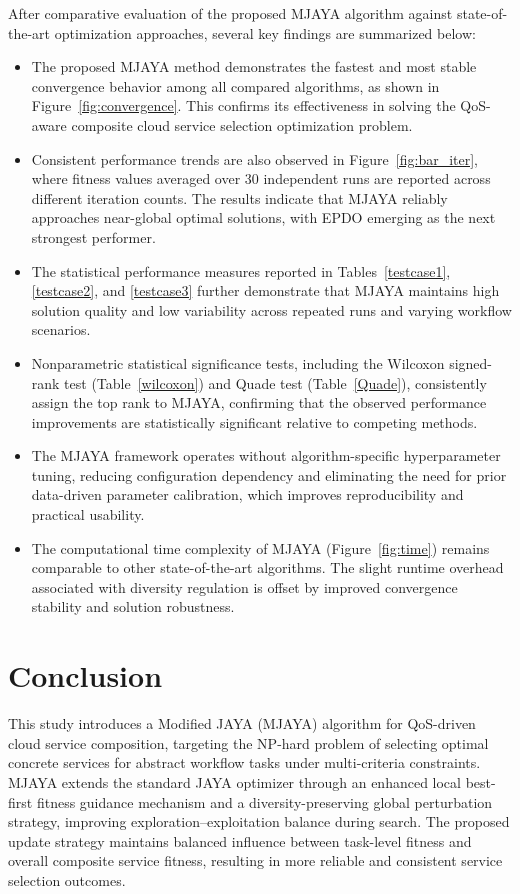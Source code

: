 \documentclass[3p,twocolumn]{elsarticle}
\theoremstyle{thmstyleone}%
\theoremstyle{thmstyletwo}%
\theoremstyle{thmstylethree}%
\begin{document}
After comparative evaluation of the proposed MJAYA algorithm against state-of-the-art optimization approaches, several key findings are summarized below:

\begin{itemize}
	\item The proposed MJAYA method demonstrates the fastest and most stable convergence behavior among all compared algorithms, as shown in Figure~\ref{fig:convergence}. This confirms its effectiveness in solving the QoS-aware composite cloud service selection optimization problem.
	
	\item Consistent performance trends are also observed in Figure~\ref{fig:bar_iter}, where fitness values averaged over 30 independent runs are reported across different iteration counts. The results indicate that MJAYA reliably approaches near-global optimal solutions, with EPDO emerging as the next strongest performer.
	
	\item The statistical performance measures reported in Tables~\ref{testcase1}, \ref{testcase2}, and \ref{testcase3} further demonstrate that MJAYA maintains high solution quality and low variability across repeated runs and varying workflow scenarios.
	
	\item Nonparametric statistical significance tests, including the Wilcoxon signed-rank test (Table~\ref{wilcoxon}) and Quade test (Table~\ref{Quade}), consistently assign the top rank to MJAYA, confirming that the observed performance improvements are statistically significant relative to competing methods.
	
	\item The MJAYA framework operates without algorithm-specific hyperparameter tuning, reducing configuration dependency and eliminating the need for prior data-driven parameter calibration, which improves reproducibility and practical usability.
	
	\item The computational time complexity of MJAYA (Figure~\ref{fig:time}) remains comparable to other state-of-the-art algorithms. The slight runtime overhead associated with diversity regulation is offset by improved convergence stability and solution robustness.
\end{itemize}

\section{Conclusion}
This study introduces a Modified JAYA (MJAYA) algorithm for QoS-driven cloud service composition, targeting the NP-hard problem of selecting optimal concrete services for abstract workflow tasks under multi-criteria constraints. MJAYA extends the standard JAYA optimizer through an enhanced local best-first fitness guidance mechanism and a diversity-preserving global perturbation strategy, improving exploration–exploitation balance during search. The proposed update strategy maintains balanced influence between task-level fitness and overall composite service fitness, resulting in more reliable and consistent service selection outcomes.
\end{document}

